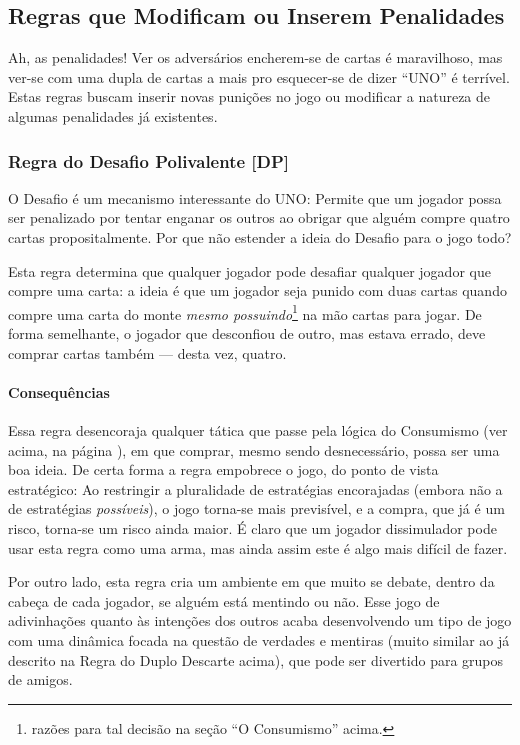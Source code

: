 \subsection{Regras que Modificam ou Inserem Penalidades}

Ah, as penalidades! Ver os adversários encherem-se de cartas é maravilhoso, mas ver-se com uma dupla de cartas a mais pro esquecer-se de dizer ``UNO'' é terrível. Estas regras buscam inserir novas punições no jogo ou modificar a natureza de algumas penalidades já existentes.

\subsubsection{Regra do Desafio Polivalente [DP]}

\label{desafiopolivalente}

O Desafio é um mecanismo interessante do UNO: Permite que um jogador possa ser penalizado por tentar enganar os outros ao obrigar que alguém compre quatro cartas propositalmente. Por que não estender a ideia do Desafio para o jogo todo?

Esta regra determina que qualquer jogador pode desafiar qualquer jogador que compre uma carta: a ideia é que um jogador seja punido com duas cartas quando compre uma carta do monte \emph{mesmo possuindo}\footnote{razões para tal decisão na seção ``O Consumismo'' acima.} na mão cartas para jogar. De forma semelhante, o jogador que desconfiou de outro, mas estava errado, deve comprar cartas também --- desta vez, quatro.

\paragraph{Consequências}

Essa regra desencoraja qualquer tática que passe pela lógica do Consumismo (ver acima, na página \pageref{consumismo}), em que comprar, mesmo sendo desnecessário, possa ser uma boa ideia. De certa forma a regra empobrece o jogo, do ponto de vista estratégico: Ao restringir a pluralidade de estratégias encorajadas (embora não a de estratégias \emph{possíveis}), o jogo torna-se mais previsível, e a compra, que já é um risco, torna-se um risco ainda maior. É claro que um jogador dissimulador pode usar esta regra como uma arma, mas ainda assim este é algo mais difícil de fazer.

Por outro lado, esta regra cria um ambiente em que muito se debate, dentro da cabeça de cada jogador, se alguém está mentindo ou não. Esse jogo de adivinhações quanto às intenções dos outros acaba desenvolvendo um tipo de jogo com uma dinâmica focada na questão de verdades e mentiras (muito similar ao já descrito na Regra do Duplo Descarte acima), que pode ser divertido para grupos de amigos.

